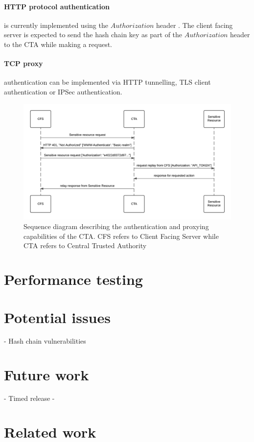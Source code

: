 \documentclass[12pt,conference]{IEEEtran}
\begin{document}
\paragraph*{HTTP protocol authentication} is currently implemented using the $Authorization$ header \cite{franks_http_1999}. The client facing server is expected to send the hash chain key as part of the $Authorization$ header to the CTA while making a request.

\paragraph*{TCP proxy} authentication can be implemented via HTTP tunnelling, TLS client authentication or IPSec authentication.


\begin{figure}[!ht]
  \centering
  \includegraphics[keepaspectratio=true,scale=0.8]{sequence_diagram}
  \caption{Sequence diagram describing the authentication and proxying capabilities of the CTA. CFS refers to Client Facing Server while CTA refers to Central Trusted Authority}
  \label{fig:ctaarchitecture}
\end{figure}


\section*{Performance testing}

\section*{Potential issues}
- Hash chain vulnerabilities \cite{lee_hash_2007}

\section*{Future work}

- Timed release \cite{chalkias_timed_2006}
- 

\section*{Related work}





\end{document}
